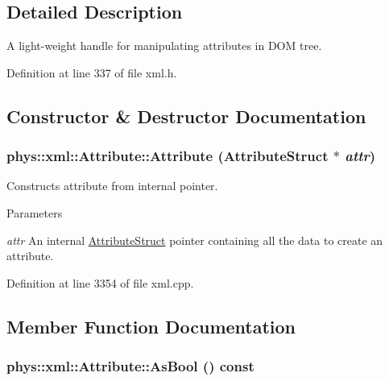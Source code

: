 \subsection{Detailed Description}
A light-\/weight handle for manipulating attributes in DOM tree. 

Definition at line 337 of file xml.h.



\subsection{Constructor \& Destructor Documentation}
\hypertarget{classphys_1_1xml_1_1Attribute_a6786df9d66c675c5a55761a7d3d512a5}{
\subsubsection[{Attribute}]{\setlength{\rightskip}{0pt plus 5cm}phys::xml::Attribute::Attribute ({\bf AttributeStruct} $\ast$ {\em attr})}}
\label{da/ddf/classphys_1_1xml_1_1Attribute_a6786df9d66c675c5a55761a7d3d512a5}


Constructs attribute from internal pointer. 


\begin{DoxyParams}{Parameters}
\item[{\em attr}]An internal \hyperlink{structphys_1_1xml_1_1AttributeStruct}{AttributeStruct} pointer containing all the data to create an attribute. \end{DoxyParams}


Definition at line 3354 of file xml.cpp.



\subsection{Member Function Documentation}
\hypertarget{classphys_1_1xml_1_1Attribute_a1c3e0f3a1722aac6a43daa135fdf622e}{
\subsubsection[{AsBool}]{\setlength{\rightskip}{0pt plus 5cm}phys::xml::Attribute::AsBool () const}}
\label{da/ddf/classphys_1_1xml_1_1Attribute_a1c3e0f3a1722aac6a43daa135fdf622e}


